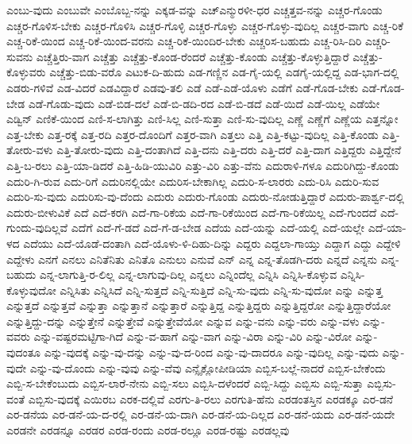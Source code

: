 {ಎಂಬು-ವುದು
ಎಂಬುವೇ
ಎಂಬೊಬ್ಬ-ನನ್ನು
ಎಕ್ಕಡ-ವನ್ನು
ಎಚ್ಎನ್ಮುರಳೀ-ಧರ
ಎಚ್ಚತ್ತವ-ನನ್ನು
ಎಚ್ಚರ-ಗೊಂಡು
ಎಚ್ಚರ-ಗೊಳಿಸ-ಬೇಕು
ಎಚ್ಚರ-ಗೊಳಿಸಿ
ಎಚ್ಚರ-ಗೊಳ್ಳಿ
ಎಚ್ಚರ-ಗೊಳ್ಳು
ಎಚ್ಚರ-ಗೊಳ್ಳು-ವುದಿಲ್ಲ
ಎಚ್ಚರ-ವಾಗು
ಎಚ್ಚ-ರಿಕೆ
ಎಚ್ಚ-ರಿಕೆ-ಯಿಂದ
ಎಚ್ಚ-ರಿಕೆ-ಯಿಂದ-ವರನು
ಎಚ್ಚ-ರಿಕೆ-ಯಿಂದಿರ-ಬೇಕು
ಎಚ್ಚರಿಸ-ಬಹುದು
ಎಚ್ಚ-ರಿಸಿ-ದಿರಿ
ಎಚ್ಚರಿ-ಸುವನು
ಎಚ್ಚೆತ್ತಿರು-ವಾಗ
ಎಚ್ಚೆತ್ತು
ಎಚ್ಚೆತ್ತು-ಕೊಂಡ-ರೆಂದರೆ
ಎಚ್ಚೆತ್ತು-ಕೊಂಡು
ಎಚ್ಚೆತ್ತು-ಕೊಳ್ಳುತ್ತಿದ್ದಾರೆ
ಎಚ್ಚೆತ್ತು-ಕೊಳ್ಳುವರು
ಎಚ್ಚೆತ್ತು-ಬಿಡು-ವರೊ
ಎಟುಕ-ದಿ-ಹುದು
ಎಡ-ಗಣ್ಣಿನ
ಎಡ-ಗೈ-ಯಲ್ಲಿ
ಎಡಗೈ-ಯಲ್ಲಿದ್ದ
ಎಡ-ಭಾಗ-ದಲ್ಲಿ
ಎಡರು-ಗಳಿವೆ
ಎಡ-ವಿದರೆ
ಎಡವಿದ್ದಾರೆ
ಎಡವು-ತಲಿ
ಎಡೆ
ಎಡೆ-ಎಡೆ-ಯೊಳು
ಎಡೆಗೆ
ಎಡೆ-ಗೊಡ-ಬೇಕು
ಎಡೆ-ಗೊಡ-ಬೇಡ
ಎಡೆ-ಗೊಡು-ವುದು
ಎಡೆ-ಬಿಡ-ದಲೆ
ಎಡೆ-ಬಿ-ಡದಿ-ರದ
ಎಡೆ-ಬಿ-ಡದೆ
ಎಡೆ-ಯಿದೆ
ಎಡೆ-ಯಿಲ್ಲ
ಎಡೆಯೇ
ಎಡ್ವಿನ್
ಎಣಿಕೆ-ಯಿಂದ
ಎಣಿ-ಸ-ಲಾಗಿತ್ತು
ಎಣಿ-ಸಿಲ್ಲ
ಎಣಿ-ಸುತ್ತಾ
ಎಣಿ-ಸು-ವುದಿಲ್ಲ
ಎಣ್ಣೆ
ಎಣ್ಣೆಗೆ
ಎಣ್ಣೆಯ
ಎತ್ತನ್ನೋ
ಎತ್ತ-ಬೇಕು
ಎತ್ತ-ರಕ್ಕೆ
ಎತ್ತ-ರದಿ
ಎತ್ತರ-ದೊಂದಿಗೆ
ಎತ್ತರ-ವಾಗಿ
ಎತ್ತಲು
ಎತ್ತಿ
ಎತ್ತಿ-ಕಟ್ಟು-ವುದಿಲ್ಲ
ಎತ್ತಿ-ಕೊಂಡು
ಎತ್ತಿ-ತೋರು-ವಳು
ಎತ್ತಿ-ತೋರು-ವುದು
ಎತ್ತಿ-ದಂತಾಗಿದೆ
ಎತ್ತಿ-ದನು
ಎತ್ತಿ-ದರು
ಎತ್ತಿ-ದರೆ
ಎತ್ತಿ-ದಾಗ
ಎತ್ತಿದ್ದರು
ಎತ್ತಿದ್ದೇನೆ
ಎತ್ತಿ-ಬ-ರಲು
ಎತ್ತಿ-ಯಾ-ಡಿದರೆ
ಎತ್ತಿ-ಹಿಡಿ-ಯುವಿರಿ
ಎತ್ತು-ವಿರಿ
ಎತ್ತು-ವೆನು
ಎದುರಾಳಿ-ಗಳೂ
ಎದುರಿಗಿದ್ದು-ಕೊಂಡು
ಎದುರಿ-ಗಿ-ರುವ
ಎದು-ರಿಗೆ
ಎದುರಿನಲ್ಲಿಯೇ
ಎದುರಿಸ-ಬೇಕಾಗಿಲ್ಲ
ಎದುರಿ-ಸ-ಲಾರರು
ಎದು-ರಿಸಿ
ಎದುರಿ-ಸುವ
ಎದುರಿ-ಸು-ವುದು
ಎದುರಿಸು-ವು-ದೆಂದು
ಎದುರು
ಎದುರು-ಗೊಂಡು
ಎದುರು-ನೋಡುತ್ತಿದ್ದಾರೆ
ಎದುರು-ಪಾರ್ಶ್ವ-ದಲ್ಲಿ
ಎದುರು-ಬೀಳುವಿಕೆ
ಎದೆ
ಎದೆ-ಕರಗಿ
ಎದೆ-ಗಾ-ರಿಕೆಯ
ಎದೆ-ಗಾ-ರಿಕೆಯಿಂದ
ಎದೆ-ಗಾ-ರಿಕೆಯಿಲ್ಲ
ಎದೆ-ಗುಂದದೆ
ಎದೆ-ಗುಂದು-ವುದಿಲ್ಲವೆ
ಎದೆಗೆ
ಎದೆ-ಗೆ-ಡದೆ
ಎದೆ-ಗೆ-ಡ-ಬೇಡ
ಎದೆಯ
ಎದೆ-ಯನ್ನು
ಎದೆ-ಯಲ್ಲಿ
ಎದೆ-ಯಲ್ಲೇ
ಎದೆ-ಯಾ-ಳದ
ಎದೆಯು
ಎದೆ-ಯೊಡೆ-ದಂತಾಗಿ
ಎದೆ-ಯೊಳು-ಳಿ-ದಿಹು-ದಿನ್ನು
ಎದ್ದರು
ಎದ್ದಲಾ-ಗಾಯ್ತು
ಎದ್ದಾಗ
ಎದ್ದು
ಎದ್ದೇಳಿ
ಎದ್ದೇಳು
ಎನಗೆ
ಎನಲು
ಎನಿತೆನಿತು
ಎನಿತೊ
ಎನುಲು
ಎನುವೆ
ಎನ್
ಎನ್ನ
ಎನ್ನ-ತೊಡಗಿ-ದರು
ಎನ್ನದೆ
ಎನ್ನನು
ಎನ್ನ-ಬಹುದು
ಎನ್ನ-ಲಾಗುತ್ತಿ-ರ-ಲಿಲ್ಲ
ಎನ್ನ-ಲಾಗುವು-ದಿಲ್ಲ
ಎನ್ನಲು
ಎನ್ನಿಂದೆಲ್ಲ
ಎನ್ನಿಸಿ
ಎನ್ನಿಸಿ-ಕೊಳ್ಳುವ
ಎನ್ನಿಸಿ-ಕೊಳ್ಳುವುದೋ
ಎನ್ನಿಸಿತು
ಎನ್ನಿಸಿದೆ
ಎನ್ನಿ-ಸುತ್ತದೆ
ಎನ್ನಿ-ಸುತ್ತಿದೆ
ಎನ್ನಿ-ಸು-ವುದು
ಎನ್ನಿ-ಸು-ವುದೋ
ಎನ್ನು
ಎನ್ನುತ್ತ
ಎನ್ನುತ್ತದೆ
ಎನ್ನುತ್ತವೆ
ಎನ್ನುತ್ತಾ
ಎನ್ನುತ್ತಾನೆ
ಎನ್ನುತ್ತಾರೆ
ಎನ್ನುತ್ತಿದ್ದ
ಎನ್ನುತ್ತಿದ್ದರು
ಎನ್ನುತ್ತಿದ್ದರೋ
ಎನ್ನುತ್ತಿದ್ದಾರೆಯೋ
ಎನ್ನುತ್ತಿದ್ದು-ದನ್ನು
ಎನ್ನುತ್ತೇನೆ
ಎನ್ನುತ್ತೇವೆ
ಎನ್ನುತ್ತೇವೆಯೋ
ಎನ್ನುವ
ಎನ್ನು-ವನು
ಎನ್ನು-ವರು
ಎನ್ನು-ವಳು
ಎನ್ನು-ವವರು
ಎನ್ನು-ವಷ್ಟರಮಟ್ಟಿಗಾ-ಗಿದೆ
ಎನ್ನು-ವ-ಹಾಗೆ
ಎನ್ನು-ವಾಗ
ಎನ್ನು-ವಿರಾ
ಎನ್ನು-ವಿರಿ
ಎನ್ನು-ವಿರೋ
ಎನ್ನು-ವುದಂತೂ
ಎನ್ನು-ವುದಕ್ಕೆ
ಎನ್ನು-ವು-ದನ್ನು
ಎನ್ನು-ವು-ದ-ರಿಂದ
ಎನ್ನು-ವು-ದಾದರೂ
ಎನ್ನು-ವುದಿಲ್ಲ
ಎನ್ನು-ವುದು
ಎನ್ನು-ವುದೇ
ಎನ್ನು-ವು-ದೊಂದು
ಎನ್ನು-ವುವು
ಎನ್ನು-ವೆವು
ಎನ್ಸೈಕ್ಲೋಪೀಡಿಯಾ
ಎಬ್ಬಿಸ-ಬಲ್ಲೆ-ನಾದರೆ
ಎಬ್ಬಿಸ-ಬೇಕೆಂದು
ಎಬ್ಬಿ-ಸ-ಬೇಕೆಂಬುದು
ಎಬ್ಬಿಸ-ಲಾರೆ-ನೇನು
ಎಬ್ಬಿ-ಸಲು
ಎಬ್ಬಿಸಿ-ದಳೆಂದರೆ
ಎಬ್ಬಿ-ಸಿದ್ದು
ಎಬ್ಬಿಸು
ಎಬ್ಬಿ-ಸುತ್ತಾ
ಎಬ್ಬಿಸು-ವಂತೆ
ಎಬ್ಬಿಸು-ವುದಕ್ಕೆ
ಎಯಿರಬ
ಎರಕ-ದಲ್ಲಿವೆ
ಎರಗು-ತಿ-ರಲು
ಎರಗುತಿ-ಹೆನು
ಎರಡಂತಸ್ತಿನ
ಎರಡಕ್ಕೂ
ಎರ-ಡನೆ
ಎರ-ಡನೆಯ
ಎರ-ಡನೆ-ಯ-ದ-ರಲ್ಲಿ
ಎರ-ಡನೆ-ಯ-ದಾಗಿ
ಎರ-ಡನೆ-ಯ-ದಿಲ್ಲದ
ಎರ-ಡನೆ-ಯದು
ಎರ-ಡನೆ-ಯದೇ
ಎರಡನೇ
ಎರಡನ್ನೂ
ಎರಡರ
ಎರಡ-ರಂದು
ಎರಡ-ರಲ್ಲೂ
ಎರಡ-ರಷ್ಟು
ಎರಡಲ್ಲವು
}
